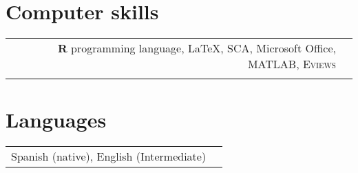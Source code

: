 \documentclass[11pt]{article}\usepackage[]{graphicx}\usepackage[]{color}
\begin{document}

\section{Computer skills} 

\begin{tabular}{rl}
\textbf{\textsf{R}} programming language, {\LaTeX}, SCA, Microsoft Office, \textsc{MATLAB}, \textsc{Eviews}\\
&
\end{tabular}


\section{Languages} 

\begin{tabular}{rl}
Spanish (native), English (Intermediate)
\end{tabular}
\end{document}
